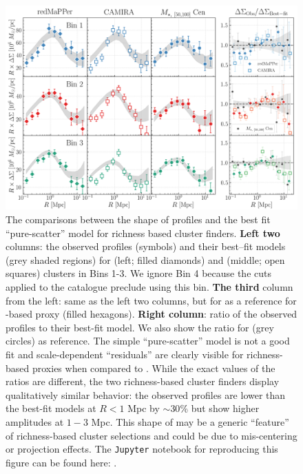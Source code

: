 \documentclass[fleqn,usenatbib,useAMS]{mnras}
\begin{document}
\begin{figure}
    \centering
    \includegraphics[width=\textwidth]{figure/fig_10}
    \caption{
        The comparisons between the shape of \rdsigma{} profiles and the best fit ``pure-scatter''
        model for richness based cluster finders. 
        \textbf{Left two} columns: the observed \rdsigma{} profiles (symbols) and their
        best--fit models (grey shaded regions) for \redm{} (left; filled diamonds) and \camira{}
        (middle; open squares) clusters in Bins 1-3. 
        We ignore Bin 4 because the cuts applied to the \camira{} catalogue preclude using this bin. 
        \textbf{The third} column from the left: same as the left two columns, but for 
         as a reference for \mstar{}-based \mvir{} proxy (filled hexagons).
        \textbf{Right column}: ratio of the observed \dsigma{} profiles to their best-fit model.
        We also show the ratio for  (grey circles) as reference.
        The simple ``pure-scatter'' model is not a good fit and scale-dependent ``residuals'' are
        clearly visible for richness-based \mvir{} proxies when compared to .
        While the exact values of the ratios are different, the two richness-based cluster finders
        display qualitatively similar behavior: the observed \dsigma{} profiles are lower than the
        best-fit models at $R<1$ Mpc by $\sim 30$\% but show higher amplitudes at $1-3$ Mpc. 
        This shape of \rdsigma{} may be a generic ``feature'' of richness-based cluster selections
        and could be due to mis-centering or projection effects.
        The \texttt{Jupyter} notebook for reproducing this figure can be found here:
        \href{https://github.com/dr-guangtou/jianbing/blob/master/notebooks/figure/fig10.ipynb}{\faGithub}.
    }
    \label{fig:richness_residual}
\end{figure}
\end{document}
